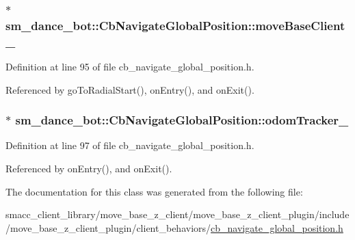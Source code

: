 \subsubsection[{\texorpdfstring{move\+Base\+Client\+\_\+}{moveBaseClient_}}]{ $\ast$ sm\+\_\+dance\+\_\+bot\+::\+Cb\+Navigate\+Global\+Position\+::move\+Base\+Client\+\_\+\hspace{0.3cm}{\ttfamily [private]}}\hypertarget{classsm__dance__bot_1_1CbNavigateGlobalPosition_a6b070ea39c113269c9b7f7732cb9e033}{}\label{classsm__dance__bot_1_1CbNavigateGlobalPosition_a6b070ea39c113269c9b7f7732cb9e033}


Definition at line 95 of file cb\+\_\+navigate\+\_\+global\+\_\+position.\+h.



Referenced by go\+To\+Radial\+Start(), on\+Entry(), and on\+Exit().

\subsubsection[{\texorpdfstring{odom\+Tracker\+\_\+}{odomTracker_}}]{ $\ast$ sm\+\_\+dance\+\_\+bot\+::\+Cb\+Navigate\+Global\+Position\+::odom\+Tracker\+\_\+\hspace{0.3cm}{\ttfamily [private]}}\hypertarget{classsm__dance__bot_1_1CbNavigateGlobalPosition_a95241571dd7b9af5b7e723d63e8325a3}{}\label{classsm__dance__bot_1_1CbNavigateGlobalPosition_a95241571dd7b9af5b7e723d63e8325a3}


Definition at line 97 of file cb\+\_\+navigate\+\_\+global\+\_\+position.\+h.



Referenced by on\+Entry(), and on\+Exit().



The documentation for this class was generated from the following file\+:\begin{DoxyCompactItemize}
\item 
smacc\+\_\+client\+\_\+library/move\+\_\+base\+\_\+z\+\_\+client/move\+\_\+base\+\_\+z\+\_\+client\+\_\+plugin/include/move\+\_\+base\+\_\+z\+\_\+client\+\_\+plugin/client\+\_\+behaviors/\hyperlink{smacc__client__library_2move__base__z__client_2move__base__z__client__plugin_2include_2move__base314f1b987667b08527fd8e96cdcf0a7}{cb\+\_\+navigate\+\_\+global\+\_\+position.\+h}\end{DoxyCompactItemize}
